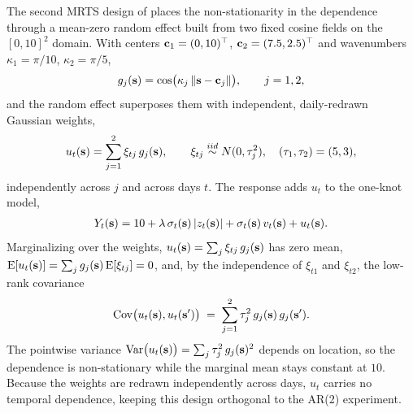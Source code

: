 \documentclass[12pt]{article}
\begin{document}
The second MRTS design of  places the non-stationarity in the dependence through a mean-zero random effect built from two fixed cosine fields on the $[0,10]^2$ domain.  With centers $\mbox{\bf c}_1 = (0, 10)^\top$, $\mbox{\bf c}_2 = (7.5, 2.5)^\top$ and wavenumbers $\kappa_1 = \pi/10$, $\kappa_2 = \pi/5$,
\begin{align}
  g_j(\mbox{\bf s}) = \cos\!\big(\kappa_j \, \| \mbox{\bf s} - \mbox{\bf c}_j \|\big), \qquad j = 1, 2,
  \label{eq:nsdep-basis}
\end{align}
and the random effect superposes them with independent, daily-redrawn Gaussian weights,
\begin{align}
  u_t(\mbox{\bf s}) = \sum_{j=1}^{2} \xi_{tj}\, g_j(\mbox{\bf s}), \qquad \xi_{tj} \stackrel{iid}{\sim} N(0, \tau_j^2), \quad (\tau_1, \tau_2) = (5, 3),
  \label{eq:nsdep-re}
\end{align}
independently across $j$ and across days $t$.  The response adds $u_t$ to the one-knot \skewt model,
\begin{align}
  Y_t(\mbox{\bf s}) = 10 + \lambda \, \sigma_t(\mbox{\bf s}) \, |z_t(\mbox{\bf s})| + \sigma_t(\mbox{\bf s}) \, v_t(\mbox{\bf s}) + u_t(\mbox{\bf s}).
  \label{eq:nsdep-gen}
\end{align}
Marginalizing over the weights, $u_t(\mbox{\bf s}) = \sum_{j} \xi_{tj}\, g_j(\mbox{\bf s})$ has zero mean, $\mathrm{E}[u_t(\mbox{\bf s})] = \sum_j g_j(\mbox{\bf s})\, \mathrm{E}[\xi_{tj}] = 0$, and, by the independence of $\xi_{t1}$ and $\xi_{t2}$, the low-rank covariance
\begin{align}
  \mathrm{Cov}\big(u_t(\mbox{\bf s}), u_t(\mbox{\bf s}')\big)
    \;=\; \sum_{j=1}^{2} \tau_j^2\, g_j(\mbox{\bf s})\, g_j(\mbox{\bf s}').
  \label{eq:nsdep-cov}
\end{align}
The pointwise variance $\mathrm{Var}\big(u_t(\mbox{\bf s})\big) = \sum_{j} \tau_j^2\, g_j(\mbox{\bf s})^2$ depends on location, so the dependence is non-stationary while the marginal mean stays constant at $10$.  Because the weights are redrawn independently across days, $u_t$ carries no temporal dependence, keeping this design orthogonal to the AR(2) experiment.


\end{document}
